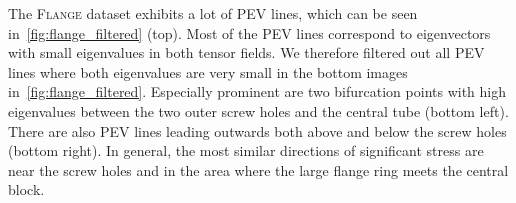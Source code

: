 %
The \textsc{Flange} dataset exhibits a lot of \ac{PEV} lines, which can be seen
in~\cref{fig:flange_filtered} (top).
%
Most of the \ac{PEV} lines correspond to eigenvectors with small eigenvalues in
both tensor fields.
%
We therefore filtered out all \ac{PEV} lines where both eigenvalues are very
small in the bottom images in~\cref{fig:flange_filtered}.
%
Especially prominent are two bifurcation points with high eigenvalues between
the two outer screw holes and the central tube (bottom left).
%
There are also \ac{PEV} lines leading outwards both above and below the screw
holes (bottom right).
%
In general, the most similar directions of significant stress are near the screw
holes and in the area where the large flange ring meets the central block.
%
%
%
